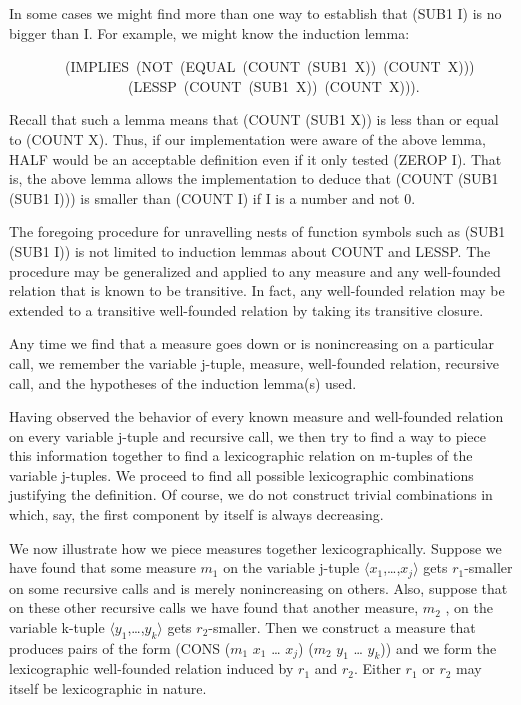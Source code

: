 \documentclass[10pt]{book}
\newenvironment{pubasis}{\begin{flushleft}}{\end{flushleft}}
\begin{document}
In some cases we might find more than one way to establish that
(SUB1 I) is no bigger than I.  For example, we might know the
induction lemma:
\begin{pubasis}
~~~~~~~~(IMPLIES~(NOT~(EQUAL~(COUNT~(SUB1~X))~(COUNT~X)))\\
~~~~~~~~~~~~~~~~~(LESSP~(COUNT~(SUB1~X))~(COUNT~X))).\\
\end{pubasis}
Recall that such a lemma means that (COUNT (SUB1 X)) is less than or
equal to (COUNT X).  Thus, if our implementation were aware
of the above lemma, HALF would be an acceptable definition even if it
only tested (ZEROP I).  That is, the above lemma allows the implementation
to deduce that (COUNT (SUB1 (SUB1 I))) is smaller than (COUNT I) if I is a number and not 0.

The foregoing procedure for unravelling nests of function symbols
such as (SUB1 (SUB1 I)) is not limited to induction lemmas about
COUNT and LESSP.  The procedure may be generalized and applied
to any measure and any well-founded relation that is known to
be transitive.  In fact, any well-founded relation may be extended
to a transitive well-founded relation by taking its transitive
closure.

Any time we find that a measure goes down or is nonincreasing on a
particular call, we remember the variable j-tuple, measure, well-founded
relation, recursive call, and the hypotheses of the induction
lemma(s) used.  

Having observed the behavior of every known measure and well-founded
relation on every variable j-tuple and recursive call, we then try
to find a way to piece this information together to find a
lexicographic relation  on m-tuples of the variable j-tuples.
We proceed to find all possible lexicographic combinations justifying
the definition.  Of course, we do not construct trivial combinations
in which, say, the first component by itself is always decreasing.

We now illustrate how we piece measures together lexicographically.  Suppose
we have found that some measure $m_{1}$ on the variable j-tuple
$\langle x_{1}$,\ldots{},$x_{j} \rangle$ gets $r_{1}$-smaller on some recursive calls
and is merely nonincreasing on others.  Also, suppose that
on these other recursive calls we have found that another measure, $m_{2}$ , on
the variable k-tuple
$\langle y_{1}$,\ldots{},$y_{k} \rangle$ gets $r_{2}$-smaller.  Then we construct
a measure that produces pairs of the form (CONS ($m_{1}$ $x_{1}$ \ldots{} $x_{j}$) ($m_{2}$ $y_{1}$ \ldots{} $y_{k}$))
and we  form the lexicographic well-founded relation induced by $r_{1}$ and $r_{2}$.
Either $r_{1}$ or $r_{2}$ may itself
be lexicographic in nature.
\end{document}
